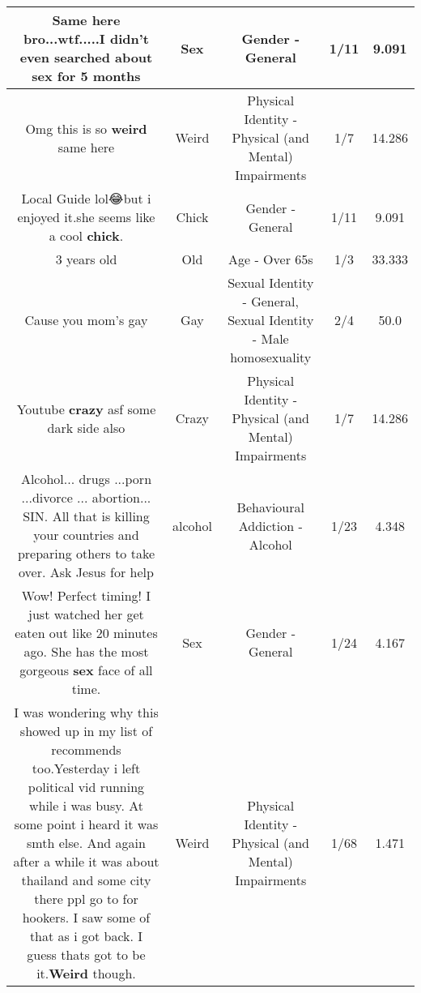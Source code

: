 \documentclass[11pt]{article}
\newlength\mylength
\begin{document}
\begin{center}
\begin{longtable}{|C{.65\mylength}|C{.30\mylength}|C{.12\mylength}|C{.12\mylength}|C{.12\mylength}|}
  \small Same here bro...wtf.....I didn't even searched about \textbf{sex} for 5 months\normalsize   & Sex & Gender - General & 1/11 & 9.091 \\  \hline
  \small Omg this is so \textbf{weird} same here\normalsize   & Weird & Physical Identity - Physical (and Mental) Impairments & 1/7 & 14.286 \\  \hline
  \small Local Guide lol😂but i enjoyed it.she seems like a cool \textbf{chick}.\normalsize   & Chick & Gender - General & 1/11 & 9.091 \\  \hline
  \small *3 years old\normalsize   & Old & Age - Over 65s & 1/3 & 33.333 \\  \hline
  \small Cause you mom's gay\normalsize   & Gay & Sexual Identity - General, Sexual Identity - Male homosexuality & 2/4 & 50.0 \\  \hline
  \small Youtube \textbf{crazy} asf some dark side also\normalsize   & Crazy & Physical Identity - Physical (and Mental) Impairments & 1/7 & 14.286 \\  \hline
  \small Alcohol... drugs ...porn ...divorce ... abortion... SIN. All that is killing your countries and preparing others to take over. Ask Jesus for help\normalsize   & alcohol & Behavioural Addiction - Alcohol & 1/23 & 4.348 \\  \hline
  \small Wow! Perfect timing! I just watched her get eaten out like 20 minutes ago. She has the most gorgeous \textbf{sex} face of all time.\normalsize   & Sex & Gender - General & 1/24 & 4.167 \\  \hline
  \small I was wondering why this showed up in my list of recommends too.Yesterday i left political vid running while i was busy. At some point i heard it was smth else. And again after a while it was about thailand and some city there ppl go to for hookers. I saw some of that as i got back. I guess thats got to be it.\textbf{Weird} though.\normalsize   & Weird & Physical Identity - Physical (and Mental) Impairments & 1/68 & 1.471 \\  \hline

\end{longtable}
\end{center}
\end{document}
